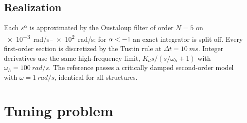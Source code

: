 \documentclass[review,12pt]{elsarticle}
\begin{document}
\begin{table}[t]
\centering\small
\caption{Controller structures. $G_1$ acts on the position error; $G_2$ on $u_1-\nu$ (cascades only).
Decision variables: two groups (translation, rotation).}\label{tab:structures}
\end{table}

\subsection{Realization}
Each $s^{\alpha}$ is approximated by the Oustaloup filter \cite{oustaloup2000} of order $N=5$ on
\SIrange{e-3}{e2}{rad/s}; for $\alpha<-1$ an exact integrator is split off. Every first-order section is
discretized by the Tustin rule at $\Delta t=\SI{10}{ms}$. Integer derivatives use the same high-frequency
limit, $K_d s/(s/\omega_h+1)$ with $\omega_h=\SI{100}{rad/s}$. The reference passes a critically damped
second-order model with $\omega=\SI{1}{rad/s}$, identical for all structures.

\section{Tuning problem}\label{sec:tuning}
\end{document}
